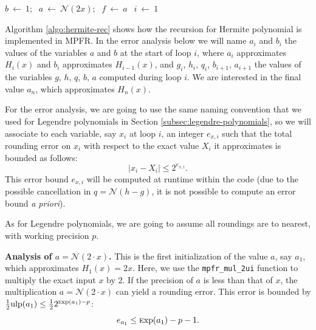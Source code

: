 \documentclass[12pt]{amsart}
\def\ulp{{\rm ulp}}
\def\Exp{{\rm \textsc exp}}
\def\N{{\mathcal N}}
\begin{document}
\begin{algorithm}[H]
  \caption{\texttt{mpfr\_hermite} recursion}
  \label{algo:hermite-rec}
  \BlankLine
  $b~\gets{}~1$;
  $~~a~\gets~\N{}(2x)$;
  $~~f~\gets~a$\;
  $~~i~\gets~1$\;
  \While{$i<n$}{
    $g~\gets~\N{}(b \cdot{} (2 * i))$\;
    $h\gets~\N{}(f \cdot{} a)$\;
    $q~\gets~\N{}(h - g)$\;
    \BlankLine
    $b~\gets~a$\;
    $a~\gets~q$\;
    $i~\gets~i + 1$\;
  }
\end{algorithm}
\vspace{.3cm}

Algorithm \ref{algo:hermite-rec} shows how the recursion for Hermite polynomial
is implemented in MPFR. In the error analysis below we will name $a_i$ and
$b_i$ the values of the variables $a$ and $b$ at the start of loop $i$, where
$a_i$ approximates $H_i(x)$ and $b_i$ approximates $H_{i-1}(x)$, and
$g_i$, $h_i$, $q_i$, $b_{i+1}$, $a_{i+1}$ the values of the variables $g$, $h$,
$q$, $b$, $a$ computed during loop $i$. We are interested in the final value
$a_n$, which approximates $H_n(x)$.

For the error analysis, we are going to use the same naming convention that
we used for Legendre polynomials in Section
\ref{subsec:legendre-polynomials}, so we will associate to each variable,
say $x_i$ at loop $i$, an integer $e_{x,i}$ such that the total rounding
error on $x_i$ with respect to the exact value $X_i$ it approximates is
bounded as follows:
\[ |x_i - X_i| \le 2^{e_{x,i}}. \]
This error bound $e_{x,i}$ will be computed at runtime within the code
(due to the possible cancellation in $q = \N{}(h - g)$, it is not possible
to compute an error bound \textit{a priori}).

As for Legendre polynomials, we are going to assume all roundings are to
nearest, with working precision $p$.

\par\noindent
\textbf{Analysis of $a = \N{}(2\cdot{}x)$.} This is the
first initialization of the value $a$, say $a_1$, which approximates $H_1(x)=2x$.
Here, we use the
\texttt{mpfr\_mul\_2ui} function to multiply the exact input $x$ by 2.
If the precision of $a$ is less than that of $x$,
the multiplication $a = \N{}(2\cdot{}x)$ can yield a rounding error.
This error is bounded by
$\frac{1}{2} \ulp(a_1) \le \frac{1}{2} 2^{\Exp(a_1) - p}$:
\[ e_{a_1} \le \Exp(a_1) - p - 1. \]
\end{document}
